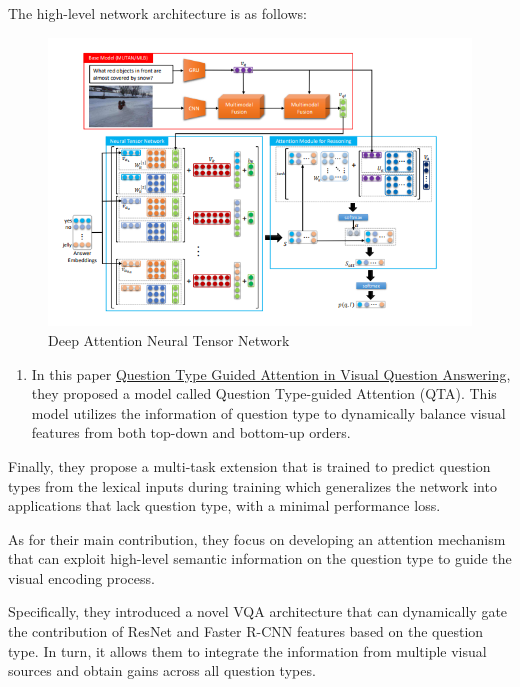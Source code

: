 \documentclass[]{book}
\providecommand{\tightlist}{%
  \setlength{\itemsep}{0pt}\setlength{\parskip}{0pt}}
\theoremstyle{definition}
\theoremstyle{definition}
\theoremstyle{definition}
\theoremstyle{remark}
\begin{document}
The high-level network architecture is as follows:

\begin{figure}
\centering
\includegraphics{img/vqa.png}
\caption{Deep Attention Neural Tensor Network}
\end{figure}

\begin{enumerate}
\def\labelenumi{\arabic{enumi}.}
\setcounter{enumi}{1}
\tightlist
\item
  In this paper \href{https://arxiv.org/pdf/1804.02088.pdf}{Question
  Type Guided Attention in Visual Question Answering}, they proposed a
  model called Question Type-guided Attention (QTA). This model utilizes
  the information of question type to dynamically balance visual
  features from both top-down and bottom-up orders.
\end{enumerate}

Finally, they propose a multi-task extension that is trained to predict
question types from the lexical inputs during training which generalizes
the network into applications that lack question type, with a minimal
performance loss.

As for their main contribution, they focus on developing an attention
mechanism that can exploit high-level semantic information on the
question type to guide the visual encoding process.

Specifically, they introduced a novel VQA architecture that can
dynamically gate the contribution of ResNet and Faster R-CNN features
based on the question type. In turn, it allows them to integrate the
information from multiple visual sources and obtain gains across all
question types.
\end{document}

